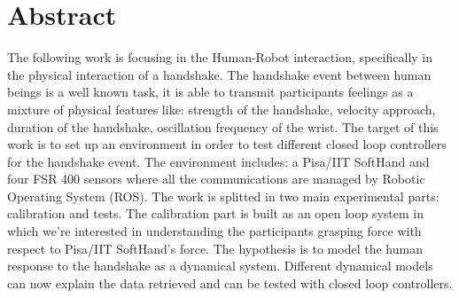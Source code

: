 
\chapter*{Abstract}
\begin{center}

\end{center}
\vspace{60px}
The following work is focusing in the Human-Robot interaction, specifically in the physical interaction of a handshake. The handshake event between human beings is a well known task, it is able to transmit participants feelings as a mixture of physical features like: strength of the handshake, velocity approach, duration of the handshake, oscillation frequency of the wrist.
The target of this work is to set up an environment in order to test different closed loop controllers for the handshake event.
The environment includes: a Pisa/IIT SoftHand and four FSR 400 sensors where all the communications are managed by Robotic Operating System (ROS).
The work is splitted in two main experimental parts: calibration and tests. The calibration part is built as an open loop system in which we're interested in understanding the participants grasping force with respect to Pisa/IIT SoftHand's force. The hypothesis is to model the human response to the handshake as a dynamical system. Different dynamical models can now explain the data retrieved and can be tested with closed loop controllers.
\\

